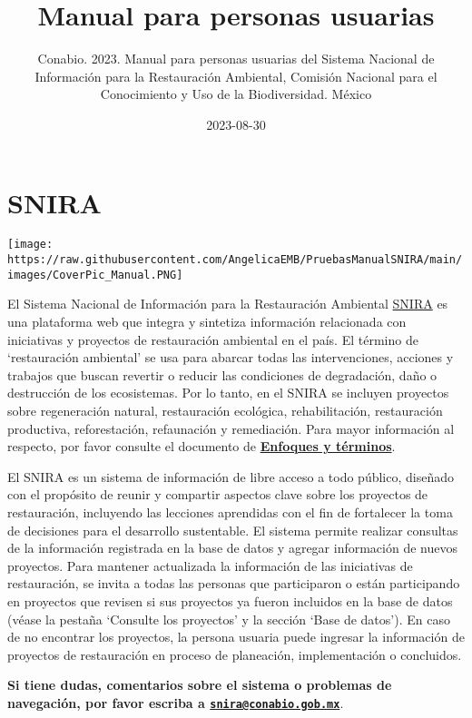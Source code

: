 \documentclass[
]{book}
\title{Manual para personas usuarias}
\author{Conabio. 2023. Manual para personas usuarias del Sistema Nacional de Información para la Restauración Ambiental, Comisión Nacional para el Conocimiento y Uso de la Biodiversidad. México}
\date{2023-08-30}
\begin{document}
\maketitle

{
\setcounter{tocdepth}{1}
\tableofcontents
}
\hypertarget{snira}{%
\chapter*{SNIRA}\label{snira}}

\texttt{[image: https://raw.githubusercontent.com/AngelicaEMB/PruebasManualSNIRA/main/images/CoverPic\_Manual.PNG]}

El Sistema Nacional de Información para la Restauración Ambiental \href{https://snira.conabio.gob.mx/}{SNIRA} es una plataforma web que integra y sintetiza información relacionada con iniciativas y proyectos de restauración ambiental en el país. El término de `restauración ambiental' se usa para abarcar todas las intervenciones, acciones y trabajos que buscan revertir o reducir las condiciones de degradación, daño o destrucción de los ecosistemas. Por lo tanto, en el SNIRA se incluyen proyectos sobre regeneración natural, restauración ecológica, rehabilitación, restauración productiva, reforestación, refaunación y remediación. Para mayor información al respecto, por favor consulte el documento de \href{https://drive.google.com/file/d/1jmIbkg1UEZI-FfwHULiqkg-rUJExKsIc/view}{\textbf{Enfoques y términos}}.

El SNIRA es un sistema de información de libre acceso a todo público, diseñado con el propósito de reunir y compartir aspectos clave sobre los proyectos de restauración, incluyendo las lecciones aprendidas con el fin de fortalecer la toma de decisiones para el desarrollo sustentable. El sistema permite realizar consultas de la información registrada en la base de datos y agregar información de nuevos proyectos. Para mantener actualizada la información de las iniciativas de restauración, se invita a todas las personas que participaron o están participando en proyectos que revisen si sus proyectos ya fueron incluidos en la base de datos (véase la pestaña `Consulte los proyectos' y la sección `Base de datos'). En caso de no encontrar los proyectos, la persona usuaria puede ingresar la información de proyectos de restauración en proceso de planeación, implementación o concluidos.

\textbf{Si tiene dudas, comentarios sobre el sistema o problemas de navegación, por favor escriba a \href{mailto:snira@conabio.gob.mx}{\nolinkurl{snira@conabio.gob.mx}}}.
\end{document}
